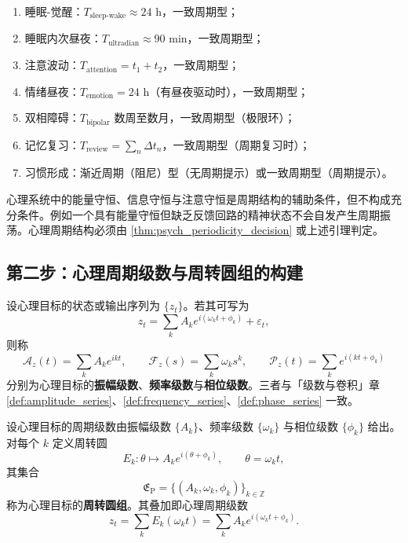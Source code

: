 \begin{example}[心理周期判定实例]\label{ex:psych_periodic_examples}
\begin{enumerate}[label=(\roman*)]
    \item 睡眠-觉醒：$T_{\text{sleep-wake}}\approx 24$ h，一致周期型；
    \item 睡眠内次昼夜：$T_{\text{ultradian}}\approx 90$ min，一致周期型；
    \item 注意波动：$T_{\text{attention}}=t_1+t_2$，一致周期型；
    \item 情绪昼夜：$T_{\text{emotion}}=24$ h（有昼夜驱动时），一致周期型；
    \item 双相障碍：$T_{\text{bipolar}}$ 数周至数月，一致周期型（极限环）；
    \item 记忆复习：$T_{\text{review}}=\sum_n \Delta t_n$，一致周期型（周期复习时）；
    \item 习惯形成：渐近周期（阻尼）型（无周期提示）或一致周期型（周期提示）。
\end{enumerate}
\end{example}

\begin{remark}[守恒量不保证周期]\label{rem:psych_invariant_not_period}
心理系统中的能量守恒、信息守恒与注意守恒是周期结构的辅助条件，但不构成充分条件。例如一个具有能量守恒但缺乏反馈回路的精神状态不会自发产生周期振荡。心理周期结构必须由 \cref{thm:psych_periodicity_decision} 或上述引理判定。
\end{remark}

\subsection{第二步：心理周期级数与周转圆组的构建}

\begin{definition}\label{def:psych_series}
设心理目标的状态或输出序列为 $\{z_t\}$。若其可写为
\[
z_t=\sum_k A_k e^{i(\omega_k t+\phi_k)}+\varepsilon_t,
\]
则称
\[
\mathcal A_z(t)=\sum_k A_k e^{ikt},\qquad
\mathcal F_z(s)=\sum_k \omega_k s^k,\qquad
\mathcal P_z(t)=\sum_k e^{i(kt+\phi_k)}
\]
分别为心理目标的\textbf{振幅级数}、\textbf{频率级数}与\textbf{相位级数}。三者与「级数与卷积」章 \cref{def:amplitude_series}、\cref{def:frequency_series}、\cref{def:phase_series} 一致。
\end{definition}

\begin{definition}[心理周转圆组]\label{def:psych_epicycle_group}
设心理目标的周期级数由振幅级数 $\{A_k\}$、频率级数 $\{\omega_k\}$ 与相位级数 $\{\phi_k\}$ 给出。对每个 $k$ 定义周转圆
\[
E_k:\theta\mapsto A_k e^{i(\theta+\phi_k)},\qquad \theta=\omega_k t,
\]
其集合
\[
\mathfrak E_{\mathrm{P}}=\{(A_k,\omega_k,\phi_k)\}_{k\in\mathbb Z}
\]
称为心理目标的\textbf{周转圆组}。其叠加即心理周期级数
\[
z_t=\sum_k E_k(\omega_k t)=\sum_k A_k e^{i(\omega_k t+\phi_k)}.
\]
\end{definition}

